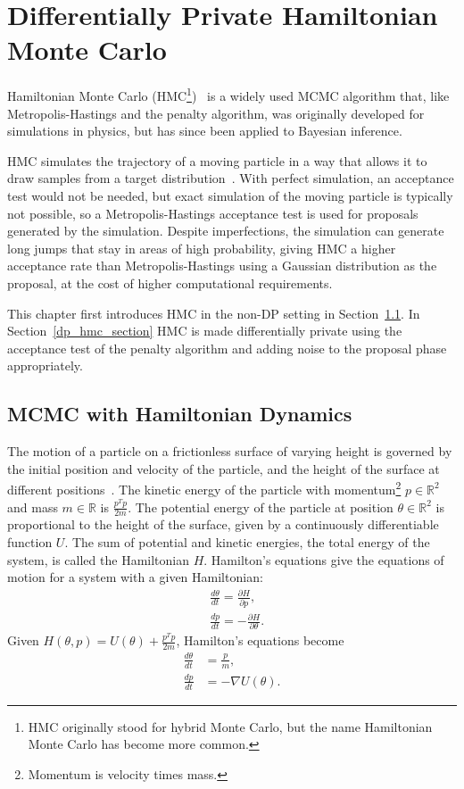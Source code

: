 \documentclass[english,twoside,openright]{HYgraduMLDS}
\newcommand{\R}{\mathbb{R}}
\begin{document}
\chapter{Differentially Private Hamiltonian Monte Carlo}\label{hmc_chapter}

Hamiltonian Monte Carlo (HMC\footnote{
    HMC originally stood for hybrid Monte Carlo, 
    but the name Hamiltonian Monte Carlo has become more common.
})~\cite{DKP87, neal2012mcmc} is a widely used MCMC algorithm that, like
Metropolis-Hastings and the penalty algorithm, was originally developed 
for simulations in physics, but has since been applied to
Bayesian inference. 

HMC simulates the trajectory of a moving particle in a way 
that allows it to draw samples from a target distribution~\cite{neal2012mcmc}. 
With perfect simulation,
an acceptance test would not be needed, but exact simulation of the moving particle 
is typically not possible, so a Metropolis-Hastings acceptance test is used
for proposals generated by the simulation. Despite imperfections, the simulation can generate long jumps
that stay in areas of high probability, giving HMC a higher acceptance rate 
than Metropolis-Hastings using a Gaussian distribution as the proposal, at the
cost of higher computational requirements.

This chapter first introduces HMC in the non-DP setting in Section~\ref{hmc_basics_section}.
In Section~\ref{dp_hmc_section} HMC is made differentially private using the
acceptance test of the penalty algorithm and adding noise to the proposal phase 
appropriately.

\section{MCMC with Hamiltonian Dynamics}\label{hmc_basics_section}

The motion of a particle on a frictionless surface of varying height is governed 
by the initial position and velocity of the particle, and the height of the 
surface at different positions~\cite{neal2012mcmc}. 
The kinetic energy of the particle with 
momentum\footnote{Momentum is velocity times mass.}
\(p \in \R^{2}\) and mass \(m \in \R\) is \(\frac{p^{T}p}{2m}\). The potential energy of the particle
at position \(\theta \in \R^{2}\) is proportional to the height of the surface, given by
a continuously differentiable function \(U\).
The sum of potential and kinetic energies, the total 
energy of the system, is called the Hamiltonian \(H\). Hamilton's equations 
give the equations of motion for a system with a given Hamiltonian:
\begin{align*}
    &\frac{d\theta}{dt} = \frac{\partial H}{\partial p},\\
    &\frac{dp}{dt} = -\frac{\partial H}{\partial \theta}.
\end{align*}
Given \(H(\theta, p) = U(\theta) + \frac{p^{T}p}{2m}\), Hamilton's equations become
\begin{align*}
    \frac{d\theta}{dt} &= \frac{p}{m}, \\
    \frac{dp}{dt} &= -\nabla U(\theta).
\end{align*}
\end{document}
